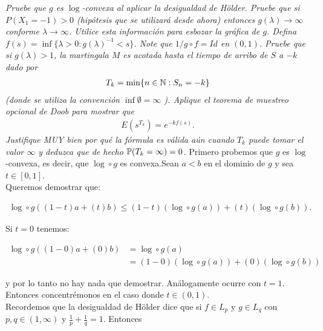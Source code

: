 \emph{
    Pruebe que $g$ es $\log$-convexa al aplicar la desigualdad de H\"older. Pruebe que si $P(X_1=-1)>0$ (hip\'otesis que se utilizar\'a desde ahora) 
    entonces $g(\lambda)\to\infty$ conforme $\lambda\to\infty$. Utilice esta informaci\'on para esbozar la gr\'afica de $g$. 
    Defina $ f(s)=\inf \{ \lambda>0:g(\lambda)^{-1} < s\} $. Note que $1/g\circ f=Id$ en $(0,1)$. Pruebe que si $g(\lambda)>1$, 
    la martingala $M$ es acotada hasta el tiempo de arribo de $S$ a $-k$ dado por 
    \null
    \begin{align}
        T_k =\min \{n\in\mathbb{N}:S_n=-k\} 
    \end{align}
    \null
    (donde se utiliza la convenci\'on $\inf\emptyset=\infty$ ). Aplique el teorema de muestreo opcional de Doob para mostrar que 
    \null
    \begin{align}
        E(s^{T_k})=e^{-k f(s)}.
    \end{align}
    \null
    Justifique MUY bien por qu\'e la f\'ormula es válida aún cuando $T_k$ puede tomar el valor $\infty$ y deduzca que de hecho 
    $ \mathbb{P}  (T_k=\infty)=0$.
}
\afterstatement
    Primero probemos que $g$ es $\log$-convexa, es decir, que $\log \circ g$ es convexa.Sean $a < b$ en el dominio de $g$ 
    y sea $t \in [0, 1]$.\\
    
    Queremos demostrar que:
    
    \begin{align}
            \log\circ g ((1-t)a + (t)b) \leq (1-t)(\log\circ g (a)) + (t)(\log\circ g (b)).
    \end{align}
    
    Si $t=0$ tenemos:
    
    \begin{align}
        \log\circ g ((1-0)a + (0)b)     &= \log\circ g (a) \\
                                        &= (1-0)(\log\circ g (a)) + (0)(\log\circ g (b))
    \end{align}
    
    y por lo tanto no hay nada que demostrar. Análogamente ocurre con $t=1$.\\
    
    Entonces concentrémonos en el caso donde $t\in (0, 1)$.\\
    
    Recordemos que la desigualdad de Hölder dice que si $f \in L_p$ y $g \in L_q$ con 
    $p,q \in (1,\infty)$ y $\frac{1}{p} + \frac{1}{q} = 1$. Entonces
                
